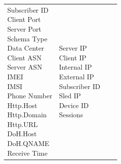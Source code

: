 \begin{description}
\begin{longtable}{p{}|p{}|p{}|p{}}
{                                                    Subscriber ID\\
                                                    Client Port\\
                                                    Server Port\\
                                                    Schema Type\\
                                                    Data Center\\
                                                    Client ASN\\
                                                    Server ASN\\
                                                    IMEI\\
                                                    IMSI\\
                                                    Phone Number\\
                                                    Http.Host\\
                                                    Http.Domain\\
                                                    Http.URL\\
                                                    DoH.Host\\
                                                    DoH.QNAME\\
                                                    Receive Time}  & \tabincell{l}{Server IP\\
                                                                                    Client IP\\
                                                                                    Internal IP\\
                                                                                    External IP\\
                                                                                    Subscriber ID\\
                                                                                    Sled IP\\
                                                                                    Device ID\\
                                                                                    Sessions\\
}
\end{longtable}
\end{description}
